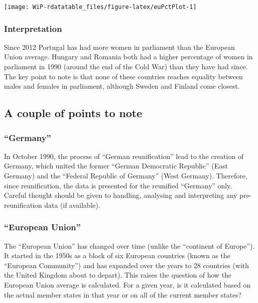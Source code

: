 \documentclass[a4paper,9pt,twocolumn,twoside,printwatermark=true]{pinp}
\begin{document}
\begin{center}\texttt{[image: WiP-rdatatable\_files/figure-latex/euPctPlot-1]} \end{center}

\subsubsection{Interpretation}\label{interpretation-1}

Since 2012 Portugal has had more women in parliament than the European
Union average. Hungary and Romania both had a higher percentage of women
in parliament in 1990 (around the end of the Cold War) than they have
had since. The key point to note is that none of these countries reaches
equality between males and females in parliament, although Sweden and
Finland come closest.

\subsection{A couple of points to
note}\label{a-couple-of-points-to-note}

\subsubsection{\texorpdfstring{``Germany''}{Germany}}\label{germany}

In October 1990, the process of ``German reunification'' lead to the
creation of Germany, which united the former ``German Democratic
Republic'' (East Germany) and the ``Federal Republic of Germany'' (West
Germany). Therefore, since reunification, the data is presented for the
reunified ``Germany'' only. Careful thought should be given to handling,
analysing and interpreting any pre-reunification data (if available).

\subsubsection{\texorpdfstring{``European
Union''}{European Union}}\label{european-union}

The ``European Union'' has changed over time (unlike the ``continent of
Europe''). It started in the 1950s as a block of six European countries
(known as the ``European Community'') and has expanded over the years to
28 countries (with the United Kingdom about to depart). This raises the
question of how the European Union average is calculated. For a given
year, is it calculated based on the actual member states in that year or
on all of the current member states?
\end{document}
